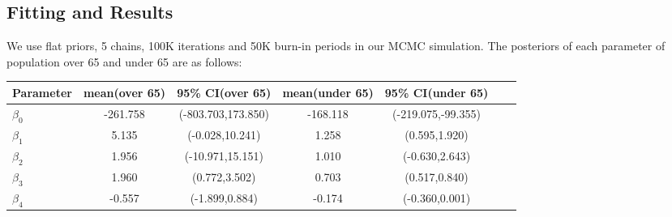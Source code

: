 \documentclass{article}
\begin{document}
\subsection{Fitting and Results}
We use flat priors, 5 chains, 100K iterations and 50K burn-in periods in our MCMC simulation. The posteriors of each parameter of population over 65 and under 65 are as follows:
\\
\begin{center}
\begin{tabular}{l*{5}{c}r}
	Parameter             & mean(over 65) &95\% CI(over 65) & mean(under 65) & 95\% CI(under 65) \\
	\hline
	$\beta_0$          & -261.758 & (-803.703,173.850)  & -168.118 & (-219.075,-99.355)  \\
	$\beta_1$            & 5.135 & (-0.028,10.241) & 1.258 & (0.595,1.920) \\
	$\beta_2$            & 1.956 & (-10.971,15.151) & 1.010 & (-0.630,2.643)\\
	$\beta_3$           & 1.960 & (0.772,3.502)  & 0.703 & (0.517,0.840) \\
	$\beta_4$           & -0.557 & (-1.899,0.884)& -0.174 & (-0.360,0.001)  \\
\end{tabular}
\end{center}
\end{document}
